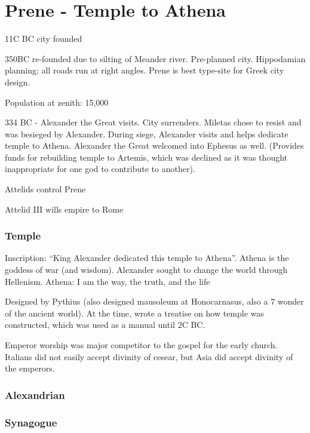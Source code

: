 \documentclass[
]{book}
\begin{document}
\hypertarget{prene---temple-to-athena}{%
\chapter{Prene - Temple to Athena}\label{prene---temple-to-athena}}

11C BC city founded

350BC re-founded due to silting of Meander river. Pre-planned city. Hippodamian planning: all roads run at right angles. Prene is best type-site for Greek city design.

Population at zenith: 15,000

334 BC - Alexander the Great visits. City surrenders. Miletas chose to resist and was besieged by Alexander. During siege, Alexander visits and helps dedicate temple to Athena. Alexander the Great welcomed into Ephesus as well. (Provides funds for rebuilding temple to Artemis, which was declined as it was thought inappropriate for one god to contribute to another).

Attelids control Prene

Attelid III wills empire to Rome

\hypertarget{temple}{%
\subsection{Temple}\label{temple}}

Inscription: ``King Alexander dedicated this temple to Athena''. Athena is the goddess of war (and wisdom). Alexander sought to change the world through Hellenism. Athena: I am the way, the truth, and the life

Designed by Pythius (also designed mausoleum at Honocarnasus, also a 7 wonder of the ancient world). At the time, wrote a treatise on how temple was constructed, which was used as a manual until 2C BC.

Emperor worship was major competitor to the gospel for the early church. Italians did not easily accept divinity of cesear, but Asia did accept divinity of the emperors.

\hypertarget{alexandrian}{%
\subsection{Alexandrian}\label{alexandrian}}

\hypertarget{synagogue}{%
\subsection{Synagogue}\label{synagogue}}
\end{document}
